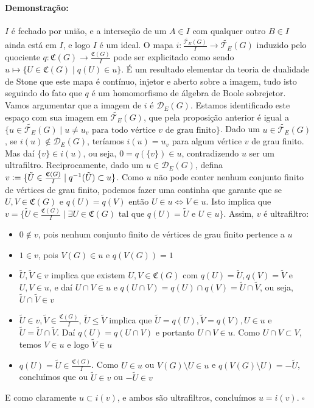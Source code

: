 \documentclass[11pt]{article}
\newcommand{\defeq}{\vcentcolon=}
\newcommand{\pulinho}{\vspace{.5cm}}
\theoremstyle{definition}
\theoremstyle{definition}
\theoremstyle{definition}
\theoremstyle{definition}
\theoremstyle{definition}
\theoremstyle{definition}
\theoremstyle{definition}
\theoremstyle{definition}
\theoremstyle{definition}
\theoremstyle{definition}
\theoremstyle{definition}
\theoremstyle{definition}
\newenvironment{prova}{\paragraph{Demonstração:}}{\hfill$\square$ 
\pulinho
}
\begin{document}
\begin{prova}
    $I$ é fechado por união, e a interseção de um $A \in I$ com qualquer outro $B \in I$ ainda está em $I$, e logo $I$ é um ideal. O mapa $i: \frac{\widetilde{\mathcal{T}_E}(G)}{I} \rightarrow \widetilde{\mathcal{T}_E}(G)$ induzido pelo quociente $q: \mathfrak{C}(G) \rightarrow \frac{\mathfrak{C}(G)}{I}$ pode ser explicitado como sendo $u \mapsto \{U \in \mathfrak{C}(G) \mid  q(U) \in u \}$. É um resultado elementar da teoria de dualidade de Stone que este mapa é contínuo, injetor e aberto sobre a imagem, tudo isto seguindo do fato que $q$ é um homomorfismo de álgebra de Boole sobrejetor. Vamos argumentar que a imagem de $i$ é $\mathcal{D}_E(G)$. Estamos identificado este espaço com sua imagem em $\widetilde{\mathcal{T}_E}(G)$, que pela proposição anterior é igual a $\{u \in \widetilde{\mathcal{T}_E}(G) \mid u \neq u_v \text{ para todo vértice } v  \text{ de grau finito}\}$. Dado um $u \in \widetilde{\mathcal{T}_E}(G)$, se $i(u) \notin \mathcal{D}_E(G)$, teríamos $i(u) = u_v$ para algum vértice $v$ de grau finito. Mas daí $\{v\} \in i(u)$, ou seja, $0 = q(\{v\}) \in u$, contradizendo $u$ ser um ultrafiltro. Reciprocamente, dado um $u \in \mathcal{D}_E(G)$, defina $v \defeq \{\tilde{U} \in \frac{\mathfrak{C}(G)}{I} \mid q^{-1}(\tilde{U})\subset u\}$. Como $u$ não pode conter nenhum conjunto finito de vértices de grau finito, podemos fazer uma continha que garante que se $U,V \in \mathfrak{C}(G)$ e $q(U) = q(V)$ então $U \in u \iff V \in u$. Isto implica que $v = \{\tilde{U} \in \frac{\mathfrak{C}(G)}{I} \mid \exists U \in \mathfrak{C}(G) \text{ tal que } q(U) = \tilde{U} \text{ e } U \in u \} $. Assim, $v$ é ultrafiltro:
    
    \begin{itemize}[]
    \item $0 \notin v$, pois nenhum conjunto finito de vértices de grau finito pertence a $u$
    \item $1 \in v$, pois $V(G) \in u$ e $q(V(G)) = 1$
    \item $\tilde{U},\tilde{V} \in v$ implica que existem $U,V \in \mathfrak{C}(G)$ com $q(U) = \tilde{U}, q(V) = \tilde{V}$ e $U,V \in u$, e daí $U\cap V \in u$ e $q(U \cap V) = q(U) \cap q(V) = \tilde{U} \cap \tilde{V}$, ou seja, $\tilde{U} \cap \tilde{V} \in v$
    \item $\tilde{U} \in v, \tilde{V} \in \frac{\mathfrak{C}(G)}{I}$, $\tilde{U}  \leq \tilde{V}$ implica que $\tilde{U} = q(U), \tilde{V}=q(V), U \in u$ e $\tilde{U} = \tilde{U}\cap\tilde{V}$. Daí $q(U) = q(U\cap V)$ e portanto $U\cap V \in u$. Como $U\cap V \subset V$, temos $V \in u$ e logo $\tilde{V} \in u$
    \item $q(U) =\tilde{U} \in \frac{\mathfrak{C}(G)}{I}$. Como $U \in u$ ou $V(G) \setminus U \in u$ e $q(V(G) \setminus U) = -\tilde{U}$, concluímos que ou $\tilde{U} \in v$ ou $-\tilde{U} \in v$
    \end{itemize}

    E como claramente $u\subset i(v)$, e ambos são ultrafiltros, concluímos $u = i(v)$.
\end{prova}
\end{document}

